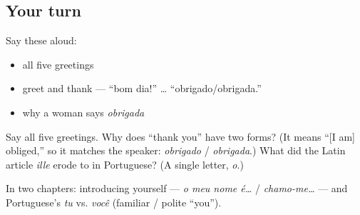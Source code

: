 \subsection*{Your turn}
Say these aloud:

\begin{itemize}
\raggedright
  \item all five greetings
  \item greet and thank — \textquotedblleft{}bom dia!\textquotedblright{} … \textquotedblleft{}obrigado/obrigada.\textquotedblright{}
  \item why a woman says \emph{obrigada}
\end{itemize}

\begin{tcolorbox}[breakable,colback=teal!4,colframe=teal!35!black,title={Before you move on}]
Say all five greetings. Why does \textquotedblleft{}thank you\textquotedblright{} have two forms? (It means \textquotedblleft{}{[}I am{]} obliged,\textquotedblright{} so it matches the speaker: \emph{obrigado} / \emph{obrigada}.) What did the Latin article \emph{ille} erode to in Portuguese? (A single letter, \emph{o}.)

In two chapters: introducing yourself — \emph{o meu nome é…} / \emph{chamo-me…} — and Portuguese's \emph{tu} vs. \emph{você} (familiar / polite \textquotedblleft{}you\textquotedblright{}).
\end{tcolorbox}
